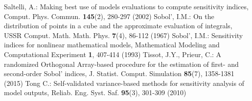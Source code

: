 \begin{thebibliography}{99}
Saltelli, A.: Making best use of models evaluations to compute sensitivity indices, Comput. Phys. Commun. \textbf{145}(2), 280-297 (2002)
Sobol', I.M.: On the distribution of points in a cube and the approximate evaluation of integrals, USSR Comput. Math. Math. Phys. \textbf{7}(4), 86-112 (1967)
Sobol', I.M.: Sensitivity indices for nonlinear mathematical models, Mathematical Modeling and Computational Experiment \textbf{1}, 407-414 (1993)
Tissot, J.Y., Prieur, C.: A randomized Orthogonal Array-based procedure for the estimation of first- and second-order Sobol' indices, J. Statist. Comput. Simulation \textbf{85}(7), 1358-1381 (2015)
Tong C.: Self-validated variance-based methods for sensitivity analysis of model outputs, Reliab. Eng. Syst. Saf. \textbf{95}(3), 301-309 (2010)

\end{thebibliography}

